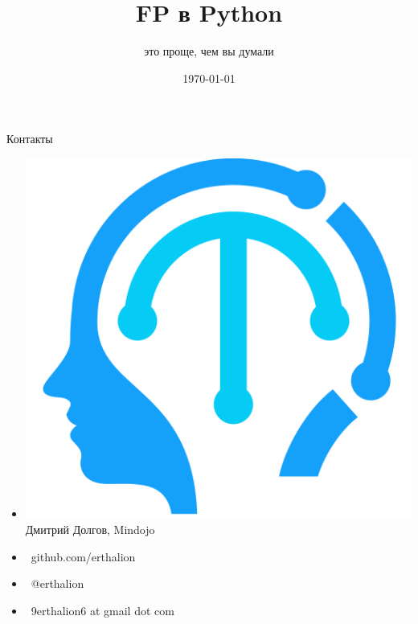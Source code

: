\documentclass[18pt, compress, aspectratio=169]{beamer}
\title{FP в Python}
\subtitle{это проще, чем вы думали}
\date{\today}
\institute{}
\def\twitter{{\FA \faTwitter}}
\def\github{{\FA \faGithubSign}}
\def\email{{\FA \faEnvelope}}
\begin{document}
\fontsize{19pt}{20}\selectfont
\maketitle

\section{}

\begin{frame}{Контакты}
    \begin{itemize}[label={}]
        \item \includegraphics[scale=0.04]{mindojo_logo.png} Дмитрий Долгов, Mindojo
        \item {\github\ github.com/erthalion}
        \item {\twitter\ @erthalion}
        \item \email\ 9erthalion6 at gmail dot com
    \end{itemize}
\end{frame}
\end{document}
